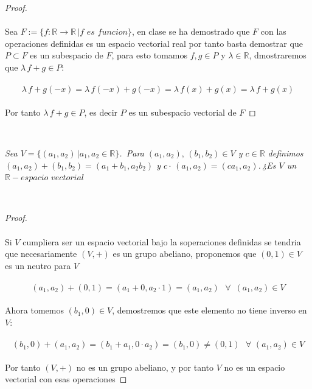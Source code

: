 \documentclass[11pt,letterpaper]{article}
\newcommand{\R}{\mathbb{R}}
\begin{document}
\begin{proof}\,\\
	\,\\
	Sea $F:=\{f:\R\rightarrow \R\,|f\,\,es\,\,funcion\}$, en clase se ha demostrado que $F$ con las operaciones definidas es un espacio vectorial real
	por tanto basta demostrar que $P\subset F$ es un subespacio de $F$, para esto tomamos $f,g\in P$ y $\lambda\in \R$, dmostraremos que $\lambda\,f+g\in P$:\,\\
	\,\\
	\begin{equation*}
		\lambda\,f+g(-x)=\lambda\,f(-x)+g(-x)=\lambda\,f(x)+g(x)=\lambda\,f+g(x)
	\end{equation*}\,\\
Por tanto $\lambda\,f+g\in P$, es decir $P$ es un subespacio vectorial de $F$
\end{proof}
\,\\
\begin{tcolorbox}[
	title = \textcolor{black}{\textcolor{white}{Problema 7}},]
\textit{Sea $V=\{(a_1,a_2)\,|a_1,a_2\in \mathbb{R}\}$. \,Para $(a_1,a_2),\,(b_1,b_2)\in V$ y $c\in \mathbb{R}$
definimos\\$(a_1,a_2)+(b_1,b_2)=(a_1+b_1,a_2b_2)$ y $c\cdot\,(a_1,a_2)=(ca_1,a_2)$.\,¿Es $V$ un $\mathbb{R}-espacio\,\,vectorial$
}
\end{tcolorbox}\,\\
\begin{proof}\,\\
	\,\\
	Si $V$ cumpliera ser un espacio vectorial bajo la soperaciones definidas se tendria que necesariamente $(V,+)$ es un grupo abeliano, proponemos que $(0,1)\in V$ es un neutro para $V$
	\,\\
	\,\\
	\begin{equation*}
		(a_1,a_2)+(0,1)=(a_1+0,a_2\cdot 1)=(a_1,a_2)\,\,\,\,\forall\,\,\,(a_1,a_2)\in V
	\end{equation*}\,\\
	Ahora tomemos $(b_1,0)\in V$, demostremos que este elemento no tiene inverso en $V$:\,\\
	\,\\
	\begin{equation*}
		(b_1,0)+(a_1,a_2)=(b_1+a_1,0\cdot a_2)=(b_1,0)\neq (0,1)\,\,\,\,\forall\,\,(a_1,a_2)\in V
	\end{equation*}\,\\
	Por tanto $(V,+)$ no es un grupo abeliano, y por tanto $V$ no es un espacio vectorial con esas operaciones    
\end{proof}\,\\
\end{document}
